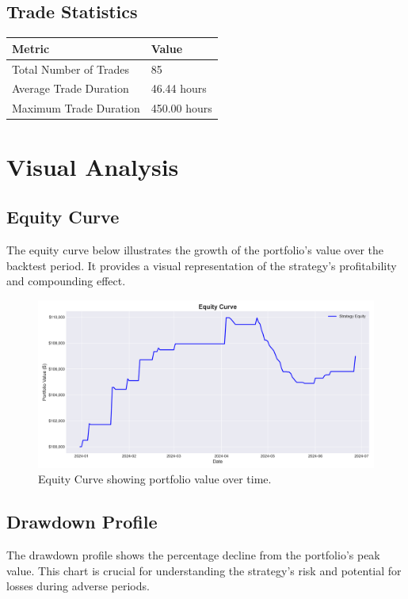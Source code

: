 \documentclass{article}
\begin{document}
\subsection{Trade Statistics}
\begin{tabular}{ll}
    \textbf{Metric} & \textbf{Value} \\
    \hline
    Total Number of Trades & 85 \\
    Average Trade Duration & 46.44 hours \\
    Maximum Trade Duration & 450.00 hours \\
\end{tabular}

\section{Visual Analysis}
\subsection{Equity Curve}
The equity curve below illustrates the growth of the portfolio's value over the backtest period. It provides a visual representation of the strategy's profitability and compounding effect.

\begin{figure}[H]
    \centering
    \includegraphics[width=\textwidth]{equity_curve.png}
    \caption{Equity Curve showing portfolio value over time.}
\end{figure}

\subsection{Drawdown Profile}
The drawdown profile shows the percentage decline from the portfolio's peak value. This chart is crucial for understanding the strategy's risk and potential for losses during adverse periods.
\end{document}
